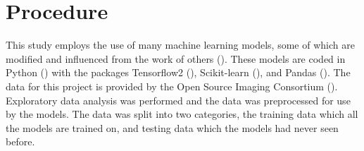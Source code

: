 \documentclass[12pt]{article}
\begin{document}


\section{Procedure}

This study employs the use of many machine learning models, some of which are modified and influenced from the work of others (\cite{kaggle}).
These models are coded in Python (\cite{10.5555/1593511}) with the packages Tensorflow2 (\cite{tensorflow2015-whitepaper}), Scikit-learn (\cite{scikit-learn}), and Pandas (\cite{mckinney2010data}).
The data for this project is provided by the Open Source Imaging Consortium (\cite{kaggle}).
Exploratory data analysis was performed and the data was preprocessed for use by the models.
The data was split into two categories, the training data which all the models are trained on, and testing data which the models had never seen before.


\end{document}
